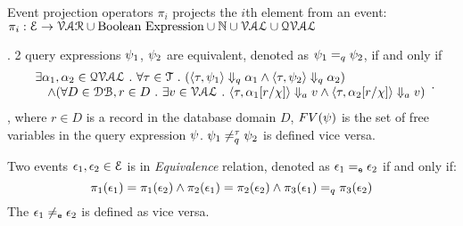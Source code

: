 % 
Event projection operators $\pi_i$ projects the $i$th element from an event: 
\\
$\pi_i : 
\mathcal{E} \to \mathcal{VAR}\cup \mbox{Boolean Expression} \cup \mathbb{N} \cup \mathcal{VAL} \cup \mathcal{QVAL} $
\\
%
%
\begin{defn}.
%
\label{def:query_equal}
2 query expressions $\psi_1$, $\psi_2$ are equivalent, denoted as $\psi_1 =_{q} \psi_2$, if and only if
$$
 \begin{array}{l} 
  \exists \alpha_1, \alpha_2 \in \mathcal{QVAL} ~.~ \forall \mathtt{\tau} \in \mathcal{T} ~.~
    (\langle \mathtt{\tau},  \psi_1 \rangle \Downarrow_q \alpha_1 \land \langle \mathtt{\tau},  \psi_2  \rangle \Downarrow_q \alpha_2) 
    \\
    \quad \land (\forall D \in \mathcal{DB}, r \in D ~.~ 
    \exists v \in \mathcal{VAL} ~.~ 
          \langle \mathtt{\tau}, \alpha_1[r/\chi] \rangle \Downarrow_a v \land \langle \mathtt{\tau},  \alpha_2[r/\chi]  \rangle \Downarrow_a v)  
  \end{array}.
$$
%
, where $r \in D$ is a record in the database domain $D$, $FV(\psi)$ is the set of free variables in the query expression $\psi$.
$\psi_1 \neq_{q}^{\mathtt{\tau}} \psi_2$  is defined vice versa.
%
\end{defn}
%
\begin{defn}
Two events $\mathtt{\epsilon}_1, \mathtt{\epsilon}_2 \in \mathcal{E}$ is in \emph{Equivalence} relation, denoted as $\mathtt{\epsilon}_1 =_{\mathtt{e}} \mathtt{\epsilon}_2$ if and only if:
\[
\pi_1(\mathtt{\epsilon}_1) = \pi_1(\mathtt{\epsilon}_2) 
\land  
\pi_2(\mathtt{\epsilon}_1) = \pi_2(\mathtt{\epsilon}_2) 
\land
\pi_{3}(\mathtt{\epsilon}_1) =_q \pi_{3}(\mathtt{\epsilon}_2)
\]
%
The $\mathtt{\epsilon}_1 \neq_{\mathtt{e}} \mathtt{\epsilon}_2$ is defined as vice versa.
\end{defn}
